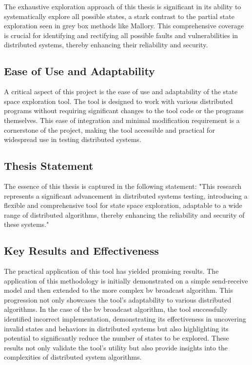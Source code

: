 \documentclass[a4paper,11pt,oneside]{report}
\begin{document}
The exhaustive exploration approach of this thesis is significant in its ability to systematically explore all possible states, a stark contrast to the partial state exploration seen in grey box methods like Mallory. This comprehensive coverage is crucial for identifying and rectifying all possible faults and vulnerabilities in distributed systems, thereby enhancing their reliability and security.

\subsection{Ease of Use and Adaptability}
A critical aspect of this project is the ease of use and adaptability of the state space exploration tool. The tool is designed to work with various distributed programs without requiring significant changes to the tool code or the programs themselves. This ease of integration and minimal modification requirement is a cornerstone of the project, making the tool accessible and practical for widespread use in testing distributed systems.

\subsection{Thesis Statement}
The essence of this thesis is captured in the following statement: "This research represents a significant advancement in distributed systems testing, introducing a flexible and comprehensive tool for state space exploration, adaptable to a wide range of distributed algorithms, thereby enhancing the reliability and security of these systems."

\subsection{Key Results and Effectiveness}
The practical application of this tool has yielded promising results. 
The application of this methodology is initially demonstrated on a simple send-receive model and then extended to the more complex bv broadcast algorithm.
This progression not only showcases the tool's adaptability to various distributed algorithms. 
In the case of the bv broadcast algorithm, the tool successfully identified incorrect implementation, demonstrating its effectiveness in uncovering invalid states and behaviors in distributed systems but also highlighting its potential to significantly reduce the number of states to be explored. These results not only validate the tool's utility but also provide insights into the complexities of distributed system algorithms.
\end{document}
